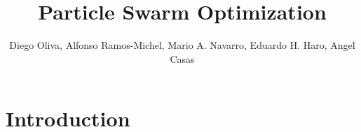 \title{Particle Swarm Optimization}
\label{chp:particle-swarm-optimization}
\author{Diego Oliva, Alfonso Ramos-Michel, Mario A. Navarro, Eduardo H. Haro, Angel Casas}
\maketitle








\hfill
\section{Introduction}
\label{sec:intro}

